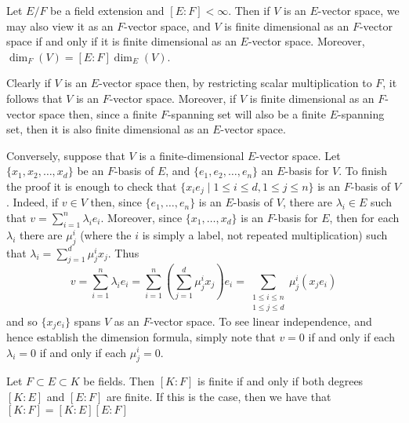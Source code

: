\documentclass{maths}
\begin{document}
\begin{lem}
    Let $E/F$ be a field extension and $[E:F]<\infty$.
    Then if $V$ is an $E$-vector space, we may also view it as an $F$-vector space, and $V$ is finite dimensional as an $F$-vector space if and only if it is finite dimensional as an $E$-vector space.
    Moreover, $\dim_F(V)=[E:F]\dim_E(V)$.
\end{lem}

\begin{prf}
    Clearly if $V$ is an $E$-vector space then, by restricting scalar multiplication to $F$, it follows that $V$ is an $F$-vector space.
    Moreover, if $V$ is finite dimensional as an $F$-vector space then, since a finite $F$-spanning set will also be a finite $E$-spanning set, then it is also finite dimensional as an $E$-vector space.

    Conversely, suppose that $V$ is a finite-dimensional $E$-vector space.
    Let $\{x_1,x_2,\ldots,x_d\}$ be an $F$-basis of $E$, and $\{e_1,e_2,\ldots,e_n\}$ an $E$-basis for $V$.
    To finish the proof it is enough to check that $\{x_i e_j \mid 1\leqslant i\leqslant d, 1\leqslant j\leqslant n\}$ is an $F$-basis of $V$.
    Indeed, if $v\in V$ then, since $\{e_1,\ldots,e_n\}$ is an $E$-basis of $V$, there are $\lambda_i\in E$ such that $v=\sum_{i=1}^n\lambda_i e_i$.
    Moreover, since $\{x_1,\ldots,x_d\}$ is an $F$-basis for $E$, then for each $\lambda_i$ there are $\mu_j^i$ (where the $i$ is simply a label, not repeated multiplication) such that $\lambda_i=\sum_{j=1}^d\mu_j^i x_j$.
    Thus
    \[
        v =
        \sum_{i=1}^n \lambda_i e_i =
        \sum_{i=1}^n\left(\sum_{j=1}^d \mu_j^i x_j\right) e_i =
        \sum_{\substack{1\leqslant i\leqslant n\\ 1\leqslant j\leqslant d}} \mu_j^i (x_j e_i)
    \]
    and so $\{x_j e_i\}$ spans $V$ as an $F$-vector space.
    To see linear independence, and hence establish the dimension formula, simply note that $v=0$ if and only if each $\lambda_i=0$ if and only if each $\mu_j^i=0$.
\end{prf}

\begin{cor}
    Let $F\subset E\subset K$ be fields.
    Then $[K:F]$ is finite if and only if both degrees $[K:E]$ and $[E:F]$ are finite.
    If this is the case, then we have that $[K:F]=[K:E][E:F]$
\end{cor}
\end{document}
